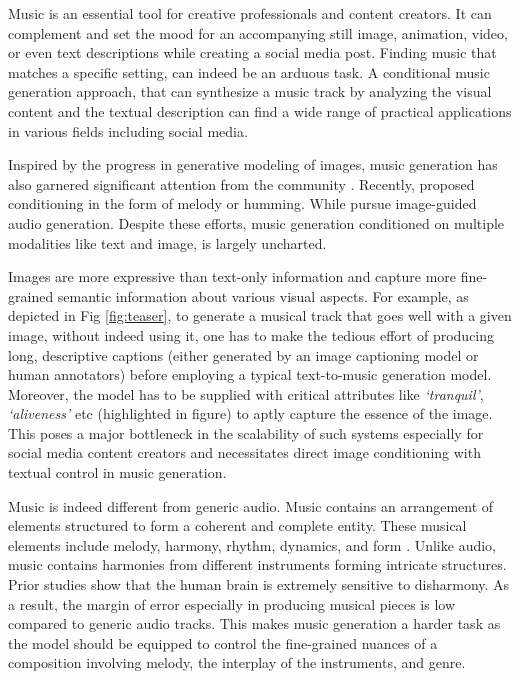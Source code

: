 Music is an essential tool for creative professionals and content creators. It can complement and set the mood for an accompanying still image, animation, video, or even text descriptions while creating a social media post. Finding music that matches a specific setting, can indeed be an arduous task. A conditional music generation approach, that can synthesize a music track by analyzing the visual content and the textual description can find a wide range of practical applications in various fields including social media. 

Inspired by the progress in generative modeling of images, music generation has also garnered significant attention from the community \cite{mousai, melody, musiclm}. 
Recently, \citet{musiclm, musicgen} proposed conditioning in the form of melody or humming.
While \citet{ihearyourturecolors} pursue image-guided audio generation. Despite these efforts, music generation conditioned on multiple modalities like text and image, is largely uncharted.

Images are more expressive \cite{imageisworththousand} than text-only information and capture more fine-grained semantic information about various visual aspects. 
For example, as depicted in Fig \ref{fig:teaser}, to generate a musical track that goes well with a given image, without indeed using it, one has to make the tedious effort of producing long, descriptive captions (either generated by an image captioning model or human annotators) before employing a typical text-to-music generation model. Moreover, the model has to be supplied with critical attributes like \textit{`tranquil'}, \textit{`aliveness'} etc (highlighted in figure) to aptly capture the essence of the image. This poses a major bottleneck in the scalability of such systems especially for social media content creators and necessitates direct image conditioning with textual control in music generation.    

Music is indeed different from generic audio. Music contains an arrangement of elements structured to form a coherent and complete entity. These musical elements include melody, harmony, rhythm, dynamics, and form \cite{schmidt2012basic, temperley2013statistical}. Unlike audio, music contains harmonies from different instruments forming intricate structures. Prior studies show \cite{habibi2014music, wu2013effects, zatorre2003music, norman2019divergence, das2020measurement, fedorenko2012sensitivity} that the human brain is extremely sensitive to disharmony. As a result, the margin of error especially in producing musical pieces is low compared to generic audio tracks. This makes music generation a harder task as the model should be equipped to control the fine-grained nuances of a composition involving melody, the interplay of the instruments, and genre.  


